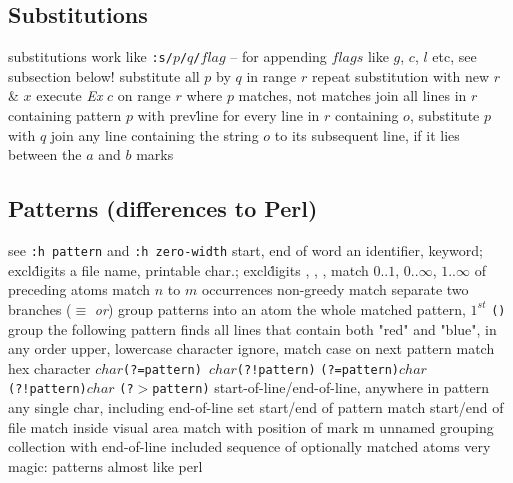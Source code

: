 \subsection{Substitutions}	{substitutions work like {\tt:s/$p$/$q$/$flag$} --
for appending $flags$ like $g$, $c$, $l$ etc, see subsection below!}
	{substitute all $p$ by $q$ in range $r$}
	{repeat substitution with new $r$ \& $x$}
	{execute {\it Ex\/} $c$ on range $r$ where $p$ mat\-ches, not matches}
	{join all lines in $r$ containing pattern $p$ with prev\. line}
	{for every line in $r$ containing $o$, substitute $p$ with $q$}
	{join any line containing the string $o$ to its subsequent line, if it lies between the $a$ and $b$ marks}

\subsection{Patterns (differences to Perl)}	{see {\tt :h pattern} and {\tt :h zero-width} }
\cmdOper{\bs$<$ \bs$>$ }	{start, end of word}
	{an identifier, keyword; excl\. digits}
	{a file name, printable char.; excl\. digits}
	{, , \key{\enter}, \key{$\gets$}}
\cmdOper{\bs = * \bs + }	{match $0..1$, $0..\infty$, $1..\infty$ of preceding atoms}
	{match $n$ to $m$ occurrences}
\cmdOper{\bs$\{-\}$ }	{non-greedy match}
\cmdOper{\bs$|$ }	{separate two branches ($\equiv$ {\it or\/})}
\cmdOper{\bs( \bs) }	{group patterns into an atom}
	{the whole matched pattern, $1^{st}$ {\tt()} group}
	{the following pattern finds all lines that contain both "red" and "blue", in any order}
	{upper, lowercase character}
	{ignore, match case on next pattern}
	{match hex character}
	{\tt $char$(?=pattern) $char$(?!pattern)\rm}
	{\tt (?=pattern)$char$ (?!pattern)$char$\rm}
	{\tt (?$>$pattern)\rm }
\cmdOper{\bs\_\^{} \bs\_\$ }	{start-of-line/end-of-line, anywhere in pattern}
	{any single char, including end-of-line}
	{set start/end of pattern}
\cmdOper{\bs \%\^{} \bs\%\$ }	{match start/end of file}
	{match inside visual area}
	{match with position of mark m}
\cmdOper{\bs\%(\bs) }	{unnamed grouping}
\cmdOper{\bs\_$[$ $]$ }	{collection with end-of-line included}
\cmdOper{\bs\%$[$ $]$ }	{sequence of optionally matched atoms}
	{very magic: patterns almost like perl}

